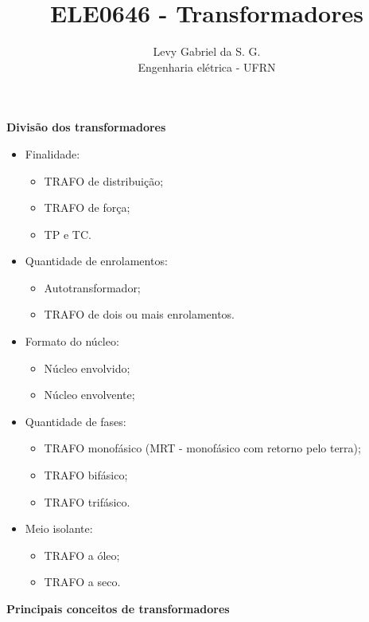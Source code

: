 \title{ELE0646 - Transformadores}
\author{Levy Gabriel da S. G. \\ Engenharia elétrica - UFRN}

\maketitle
\thispagestyle{fancy}

\textbf{Divisão dos transformadores}

\begin{itemize}
    \item Finalidade:
    \begin{itemize}
        \item TRAFO de distribuição;
        \item TRAFO de força;
        \item TP e TC.
    \end{itemize}
    \item Quantidade de enrolamentos:
    \begin{itemize}
        \item Autotransformador;
        \item TRAFO de dois ou mais enrolamentos.
    \end{itemize}
    \item Formato do núcleo:
    \begin{itemize}
        \item Núcleo envolvido;
        \item Núcleo envolvente;
    \end{itemize}
    \item Quantidade de fases:
    \begin{itemize}
        \item TRAFO monofásico (MRT - monofásico com retorno pelo terra);
        \item TRAFO bifásico;
        \item TRAFO trifásico.
    \end{itemize}
    \item Meio isolante:
    \begin{itemize}
        \item TRAFO a óleo;
        \item TRAFO a seco.
    \end{itemize}
\end{itemize}

\textbf{Principais conceitos de transformadores}


